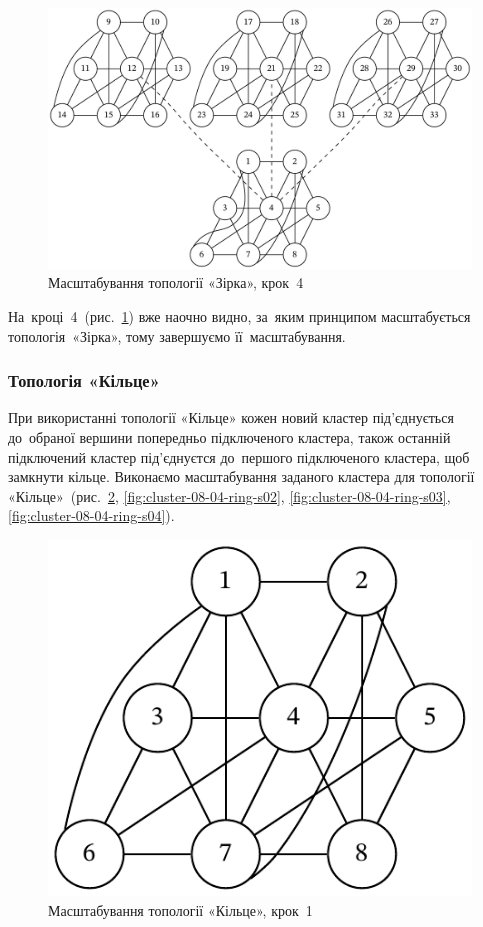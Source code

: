 \documentclass[
	a4paper,
	oneside,
	BCOR = 10mm,
	DIV = 12,
	12pt,
	headings = normal,
]{scrartcl}
\begin{document}
				\begin{figure}[!htbp]
					\centering
					\includegraphics[height=12\baselineskip]{./assets/cluster-08-03-star-s04.pdf}
					\caption{Масштабування топології «Зірка», крок~4}
					\label{fig:cluster-08-03-star-s04}
				\end{figure}

				На~кроці~4~(рис.~\ref{fig:cluster-08-03-star-s04}) вже наочно видно, за~яким принципом масштабується топологія~«Зірка», тому завершуємо її~масштабування.

			\subsubsection{Топологія «Кільце»}
				При використанні топології «Кільце» кожен новий кластер під'єднується до~обраної вершини попередньо підключеного кластера, також останній підключений кластер під'єднуєтся до~першого підключеного кластера, щоб замкнути кільце. Виконаємо масштабування заданого кластера для топології «Кільце»~(рис.~\ref{fig:cluster-08-04-ring-s01}, \ref{fig:cluster-08-04-ring-s02}, \ref{fig:cluster-08-04-ring-s03}, \ref{fig:cluster-08-04-ring-s04}).

				\begin{figure}[!htbp]
					\centering
					\includegraphics[height=6\baselineskip]{./assets/cluster-08-01-named.pdf}
					\caption{Масштабування топології «Кільце», крок~1}
					\label{fig:cluster-08-04-ring-s01}
				\end{figure}
\end{document}
